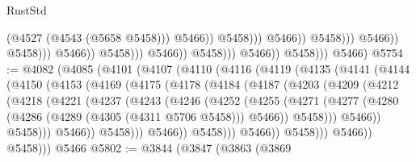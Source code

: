 \begin{lexlean}{RustStd}
\begin{coremodule}
                                                                  (@4527 (@4543 (@5658 @5458)))
                                                                  @5466))
                                                              @5458)))
                                                        @5466))
                                                    @5458)))
                                              @5466))
                                          @5458)))
                                    @5466))
                                @5458)))
                          @5466))
                      @5458)))
                @5466))
            @5458)))
      @5466)
@5754 := @4082
    (@4085
      (@4101
        (@4107
          (@4110
            (@4116
              (@4119
                (@4135
                  (@4141
                    (@4144
                      (@4150
                        (@4153
                          (@4169
                            (@4175
                              (@4178
                                (@4184
                                  (@4187
                                    (@4203
                                      (@4209
                                        (@4212
                                          (@4218
                                            (@4221
                                              (@4237
                                                (@4243
                                                  (@4246
                                                    (@4252
                                                      (@4255
                                                        (@4271
                                                          (@4277
                                                            (@4280
                                                              (@4286
                                                                (@4289 (@4305 (@4311 @5706 @5458)))
                                                                @5466))
                                                            @5458)))
                                                      @5466))
                                                  @5458)))
                                            @5466))
                                        @5458)))
                                  @5466))
                              @5458)))
                        @5466))
                    @5458)))
              @5466))
          @5458)))
    @5466
@5802 := @3844
    (@3847
      (@3863
        (@3869

\end{coremodule}
\end{lexlean}
